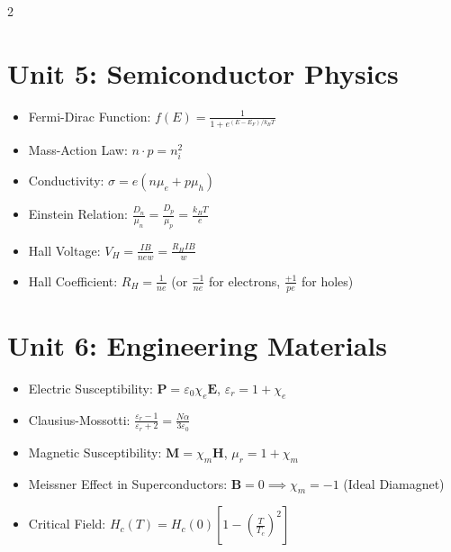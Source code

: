 \begin{multicols}{2}
{\section*{Unit 5: Semiconductor Physics}
\begin{itemize}[leftmargin=*]
    \item Fermi-Dirac Function: $f(E) = \frac{1}{1 + e^{(E - E_F)/k_B T}}$
    \item Mass-Action Law: $n \cdot p = n_i^2$
    \item Conductivity: $\sigma = e(n\mu_e + p\mu_h)$
    \item Einstein Relation: $\frac{D_n}{\mu_n} = \frac{D_p}{\mu_p} = \frac{k_B T}{e}$
    \item Hall Voltage: $V_H = \frac{I B}{n e w} = \frac{R_H I B}{w}$
    \item Hall Coefficient: $R_H = \frac{1}{n e}$ (or $\frac{-1}{ne}$ for electrons, $\frac{+1}{pe}$ for holes)
\end{itemize}

\section*{Unit 6: Engineering Materials}
\begin{itemize}[leftmargin=*]
    \item Electric Susceptibility: $\mathbf{P} = \varepsilon_0 \chi_e \mathbf{E}$, $\varepsilon_r = 1 + \chi_e$
    \item Clausius-Mossotti: $\frac{\varepsilon_r - 1}{\varepsilon_r + 2} = \frac{N\alpha}{3\varepsilon_0}$
    \item Magnetic Susceptibility: $\mathbf{M} = \chi_m \mathbf{H}$, $\mu_r = 1 + \chi_m$
    \item Meissner Effect in Superconductors: $\mathbf{B} = 0 \implies \chi_m = -1$ (Ideal Diamagnet)
    \item Critical Field: $H_c(T) = H_c(0)\left[1 - \left(\frac{T}{T_c}\right)^2\right]$
\end{itemize}
}
\end{multicols}
\newpage
